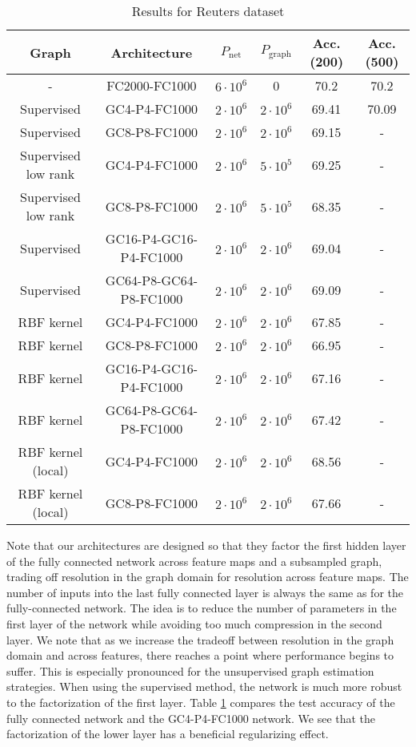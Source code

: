 \begin{table}[H]
\caption{Results for Reuters dataset}
\begin{center}
\begin{tabular}{|c|c|c|c|c|c|}
\hline
Graph & Architecture & $P_\text{net}$ & $P_\text{graph}$ & Acc. (200) & Acc. (500)\\
\hline
- &FC2000-FC1000 & $6 \cdot 10^6$ & 0 &70.2 & 70.2 \\
Supervised & GC4-P4-FC1000 & $2\cdot 10^6$ & $2 \cdot 10^6$ & 69.41 & 70.09 \\
Supervised & GC8-P8-FC1000 & $2 \cdot 10^6$ & $2 \cdot 10^6$ & 69.15 & - \\
Supervised low rank & GC4-P4-FC1000 & $2\cdot 10^6$ & $5 \cdot 10^5$ & 69.25 & - \\
Supervised low rank & GC8-P8-FC1000 & $2 \cdot 10^6$ & $5 \cdot 10^5$ & 68.35 & - \\
Supervised & GC16-P4-GC16-P4-FC1000& $2 \cdot 10^6$ & $2 \cdot 10^6$ & 69.04 & - \\
Supervised &GC64-P8-GC64-P8-FC1000 & $2 \cdot 10^6$ & $2 \cdot 10^6$ & 69.09 & - \\
RBF kernel & GC4-P4-FC1000 & $2\cdot 10^6$ & $2 \cdot 10^6$ & 67.85 & - \\
RBF kernel & GC8-P8-FC1000 & $2 \cdot 10^6$ & $2 \cdot 10^6$ & 66.95 & - \\
RBF kernel & GC16-P4-GC16-P4-FC1000 & $2 \cdot 10^6$ & $2 \cdot 10^6$ & 67.16 & - \\
RBF kernel & GC64-P8-GC64-P8-FC1000 & $2 \cdot 10^6$ & $2 \cdot 10^6$ & 67.42 & - \\
RBF kernel (local)& GC4-P4-FC1000 & $2\cdot 10^6$ & $2 \cdot 10^6$ & 68.56 & - \\
RBF kernel (local) & GC8-P8-FC1000 & $2 \cdot 10^6$ & $2 \cdot 10^6$ & 67.66 & - \\
\hline
\end{tabular}
\end{center}
\label{reuterstable}
\end{table}

Note that our architectures are designed so that they factor the first hidden layer of the fully connected network across feature maps and a subsampled graph, trading off resolution in the graph domain for resolution across feature maps. The number of inputs into the last fully connected layer is always the same as for the fully-connected network. The idea is to reduce the number of parameters in the first layer of the network while avoiding too much compression in the second layer. 
We note that as we increase the tradeoff between resolution in the graph domain and across features, there reaches a point where performance begins to suffer. This is especially pronounced for the unsupervised graph estimation strategies. When using the supervised method, the network is much more robust to the factorization of the first layer. Table \ref{reuterstable} compares the test accuracy of the fully connected network and the GC4-P4-FC1000 network. We see that the factorization of the lower layer has a beneficial regularizing effect. 


